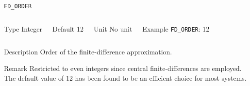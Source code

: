 \documentclass[xcolor=dvipsnames,t]{beamer}
\begin{document}
\begin{frame}[allowframebreaks]{\texttt{FD\_ORDER}} \label{FD_ORDER}
\vspace*{-12pt}
\begin{columns}
\begin{block}{Type}
Integer
\end{block}

\begin{block}{Default}
12
\end{block}

\begin{block}{Unit}
No unit
\end{block}

\begin{block}{Example}
\texttt{FD\_ORDER}: 12
\end{block}
\end{columns}

\begin{block}{Description}
Order of the finite-difference approximation. 
\end{block}

\begin{block}{Remark}
Restricted to even integers since central finite-differences are employed. The default value of 12 has been found to be an efficient choice for most systems.
\end{block}

\end{frame}
\end{document}

